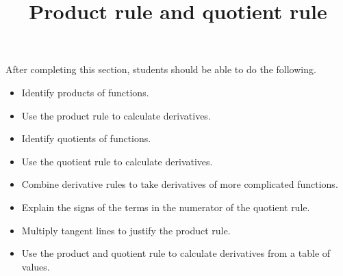 \documentclass{ximera}
\title{Product rule and quotient rule}
\begin{document}
\begin{abstract}
\end{abstract}

\maketitle

\begin{sectionOutcomes}

After completing this section, students should be able to do the following.

\begin{itemize}
	\item Identify products of functions.
	\item Use the product rule to calculate derivatives.
	\item Identify quotients of functions.
	\item Use the quotient rule to calculate derivatives.
	\item Combine derivative rules to take derivatives of more complicated functions.
        \item Explain the signs of the terms in the numerator of the quotient rule.
        \item Multiply tangent lines to justify the product rule.
	\item Use the product and quotient rule to calculate derivatives from a table of values.
\end{itemize}

\end{sectionOutcomes}
\end{document}
